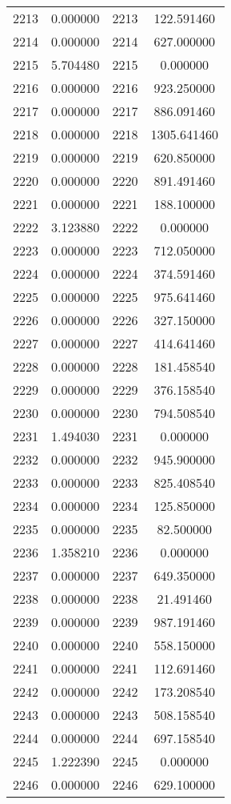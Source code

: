 \documentclass[12pt]{article}
\begin{document}
\begin{longtable}{@{}cccc@{}}
2213 & 0.000000 & 2213 & 122.591460 \\
2214 & 0.000000 & 2214 & 627.000000 \\
2215 & 5.704480 & 2215 & 0.000000 \\
2216 & 0.000000 & 2216 & 923.250000 \\
2217 & 0.000000 & 2217 & 886.091460 \\
2218 & 0.000000 & 2218 & 1305.641460 \\
2219 & 0.000000 & 2219 & 620.850000 \\
2220 & 0.000000 & 2220 & 891.491460 \\
2221 & 0.000000 & 2221 & 188.100000 \\
2222 & 3.123880 & 2222 & 0.000000 \\
2223 & 0.000000 & 2223 & 712.050000 \\
2224 & 0.000000 & 2224 & 374.591460 \\
2225 & 0.000000 & 2225 & 975.641460 \\
2226 & 0.000000 & 2226 & 327.150000 \\
2227 & 0.000000 & 2227 & 414.641460 \\
2228 & 0.000000 & 2228 & 181.458540 \\
2229 & 0.000000 & 2229 & 376.158540 \\
2230 & 0.000000 & 2230 & 794.508540 \\
2231 & 1.494030 & 2231 & 0.000000 \\
2232 & 0.000000 & 2232 & 945.900000 \\
2233 & 0.000000 & 2233 & 825.408540 \\
2234 & 0.000000 & 2234 & 125.850000 \\
2235 & 0.000000 & 2235 & 82.500000 \\
2236 & 1.358210 & 2236 & 0.000000 \\
2237 & 0.000000 & 2237 & 649.350000 \\
2238 & 0.000000 & 2238 & 21.491460 \\
2239 & 0.000000 & 2239 & 987.191460 \\
2240 & 0.000000 & 2240 & 558.150000 \\
2241 & 0.000000 & 2241 & 112.691460 \\
2242 & 0.000000 & 2242 & 173.208540 \\
2243 & 0.000000 & 2243 & 508.158540 \\
2244 & 0.000000 & 2244 & 697.158540 \\
2245 & 1.222390 & 2245 & 0.000000 \\
2246 & 0.000000 & 2246 & 629.100000 \\

\end{longtable}
\end{document}
